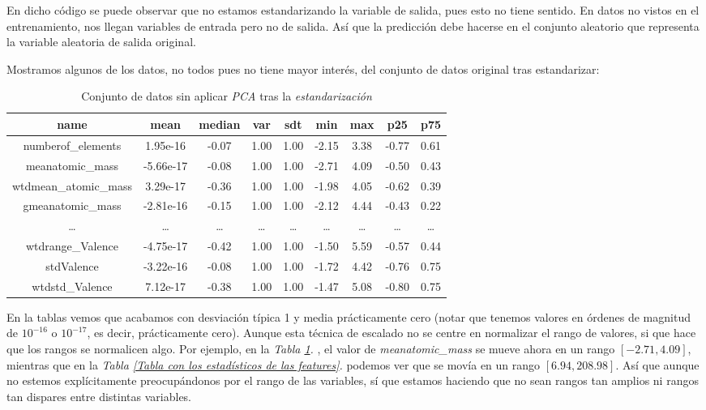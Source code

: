 \documentclass[11pt]{article}
\begin{document}
En dicho código se puede observar que no estamos estandarizando la variable de salida, pues esto no tiene sentido. En datos no vistos en el entrenamiento, nos llegan variables de entrada pero no de salida. Así que la predicción debe hacerse en el conjunto aleatorio que representa la variable aleatoria de salida original.

Mostramos algunos de los datos, no todos pues no tiene mayor interés, del conjunto de datos original tras estandarizar:

\begin{table}[H]
\centering
\begin{tabular}{|c|c|c|c|c|c|c|c|c|}
\hline
\textbf{name} &                                      \textbf{mean} &    \textbf{median} &       \textbf{var} &       \textbf{sdt} &       \textbf{min} &       \textbf{max} &       \textbf{p25} &       \textbf{p75} \\
\hline
numberof\_elements              &  1.95e-16& -0.07&  1.00&  1.00& -2.15&  3.38& -0.77&  0.61 \\
meanatomic\_mass                & -5.66e-17& -0.08&  1.00&  1.00& -2.71&  4.09& -0.50&  0.43 \\
wtdmean\_atomic\_mass            &  3.29e-17& -0.36&  1.00&  1.00& -1.98&  4.05& -0.62&  0.39 \\
gmeanatomic\_mass               & -2.81e-16& -0.15&  1.00&  1.00& -2.12&  4.44& -0.43&  0.22 \\
\ldots &  \ldots & \ldots & \ldots & \ldots &  \ldots & \ldots & \ldots & \ldots \\
wtdrange\_Valence               & -4.75e-17& -0.42&  1.00&  1.00& -1.50&  5.59& -0.57&  0.44 \\
stdValence                     & -3.22e-16& -0.08&  1.00&  1.00& -1.72&  4.42& -0.76&  0.75 \\
wtdstd\_Valence                 &  7.12e-17& -0.38&  1.00&  1.00& -1.47&  5.08& -0.80&  0.75 \\
\hline
    \end{tabular}
    \caption{Conjunto de datos sin aplicar \emph{PCA} tras la \emph{estandarización}}
    \label{tabla_sin_pca}
\end{table}

En la tablas vemos que acabamos con desviación típica 1 y media prácticamente cero (notar que tenemos valores en órdenes de magnitud de $10^{-16}$ o $10^{-17}$, es decir, prácticamente cero). Aunque esta técnica de escalado no se centre en normalizar el rango de valores, si que hace que los rangos se normalicen algo. Por ejemplo, en la \emph{Tabla \ref{tabla_sin_pca}. }, el valor de \emph{meanatomic\_mass} se mueve ahora en un rango $[-2.71, 4.09]$, mientras que en la \emph{Tabla \ref{Tabla con los estadísticos de las features}. } podemos ver que se movía en un rango $[6.94, 208.98]$. Así que aunque no estemos explícitamente preocupándonos por el rango de las variables, sí que estamos haciendo que no sean rangos tan amplios ni rangos tan dispares entre distintas variables.
\end{document}

